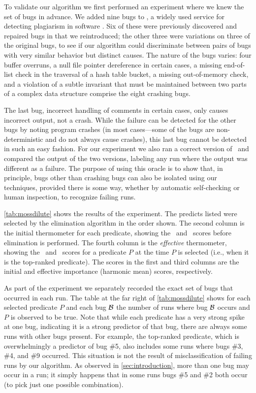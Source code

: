 To validate our algorithm we first performed an experiment where we
knew the set of bugs in advance.  We added nine bugs to \moss, a
widely used service for detecting plagiarism in software
\cite{Schleimer:2003:WLA}.  Six of these were previously discovered
and repaired bugs in \moss that we reintroduced; the other three were
variations on three of the original bugs, to see if our algorithm could
discriminate between pairs of bugs with very similar behavior but
distinct causes.  The nature of the bugs varies: four
buffer overruns, a null file pointer dereference in certain cases, a
missing end-of-list check in the traversal of a hash table bucket, a missing
out-of-memory check, and a violation of a subtle invariant that must be maintained between two
parts of a complex data structure comprise the eight crashing bugs.  

The last bug, incorrect handling of comments in certain cases, only
causes incorrect output, not a crash.  While the failure can be
detected for the other bugs by noting program crashes (in most
cases---some of the bugs are non-deterministic and do not always
cause crashes), this last bug cannot be detected in such an easy fashion.
For our experiment we also ran a correct version of \moss\ and
compared the output of the two versions, labeling any run where the
output was different as a failure.  The purpose of using this oracle
is to show that, in principle, bugs other than crashing bugs can also
be isolated using our techniques, provided there is some way, whether
by automatic self-checking or human inspection, to recognize failing
runs.



\autoref{tab:mossdilute} shows the results of the experiment.  The
predicts listed were selected by the elimination algorithm in the
order shown.  The second column is the initial thermometer for each
predicate,  showing the \context\ and \increase\ scores before
elimination is performed. The fourth column is the {\em effective}
thermometer, showing the \context\ and \increase\ scores for a
predicate $P$ at the time $P$ is selected (i.e., when it is the
top-ranked predicate).  The scores in the first and third columns are
the initial and effective importance (harmonic mean) scores, respectively.

As part of the experiment we separately recorded the exact set of
bugs that occurred in each run.
The table at the far right of \autoref{tab:mossdilute} shows for
each selected predicate $P$ and each bug ${\cal B}$ the number of runs where
bug ${\cal B}$ occurs and $P$ is observed to be true.  Note that while each
predicate has a very strong spike at one bug, indicating it is a
strong predictor of that bug, there are always some runs with other
bugs present.  For example, the top-ranked predicate, which is
overwhelmingly a predictor of bug \#5, also includes some runs where
bugs \#3, \#4, and \#9 occurred.  This situation is not the result of
misclassification of failing runs by our algorithm.  As observed in
\autoref{sec:introduction}, more than one bug may occur in a run;
it simply happens that in some runs bugs \#5 and \#2 both occur (to
pick just one possible combination).

